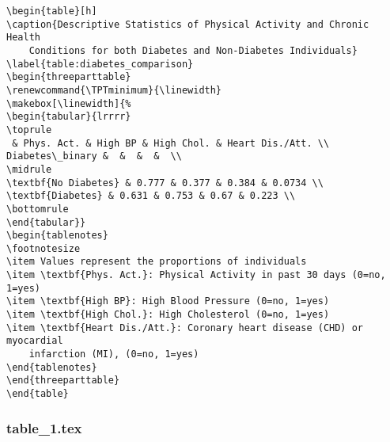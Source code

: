 \documentclass[11pt]{article}
\begin{document}
\begin{Verbatim}[tabsize=4]
\begin{table}[h]
\caption{Descriptive Statistics of Physical Activity and Chronic Health
	Conditions for both Diabetes and Non-Diabetes Individuals}
\label{table:diabetes_comparison}
\begin{threeparttable}
\renewcommand{\TPTminimum}{\linewidth}
\makebox[\linewidth]{%
\begin{tabular}{lrrrr}
\toprule
 & Phys. Act. & High BP & High Chol. & Heart Dis./Att. \\
Diabetes\_binary &  &  &  &  \\
\midrule
\textbf{No Diabetes} & 0.777 & 0.377 & 0.384 & 0.0734 \\
\textbf{Diabetes} & 0.631 & 0.753 & 0.67 & 0.223 \\
\bottomrule
\end{tabular}}
\begin{tablenotes}
\footnotesize
\item Values represent the proportions of individuals
\item \textbf{Phys. Act.}: Physical Activity in past 30 days (0=no, 1=yes)
\item \textbf{High BP}: High Blood Pressure (0=no, 1=yes)
\item \textbf{High Chol.}: High Cholesterol (0=no, 1=yes)
\item \textbf{Heart Dis./Att.}: Coronary heart disease (CHD) or myocardial
	infarction (MI), (0=no, 1=yes)
\end{tablenotes}
\end{threeparttable}
\end{table}

\end{Verbatim}

\subsubsection*{table\_1.tex}
\end{document}
